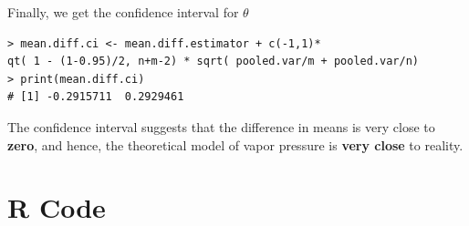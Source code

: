 \documentclass[12pt,letterpaper,titlepage,en-US]{article}
\begin{document}
Finally, we get the confidence interval for $\theta$
\begin{knitrout}
\color{fgcolor}
\begin{kframe}
\begin{verbatim}
> mean.diff.ci <- mean.diff.estimator + c(-1,1)*
qt( 1 - (1-0.95)/2, n+m-2) * sqrt( pooled.var/m + pooled.var/n)
> print(mean.diff.ci)
# [1] -0.2915711  0.2929461
\end{verbatim}
\end{kframe}
\end{knitrout}

The confidence interval suggests that the difference in means is very close to \textbf{zero}, and hence, the theoretical model of vapor pressure is \textbf{very close} to reality.



\section{R Code}




\end{document}
